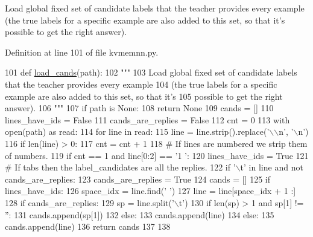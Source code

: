 \begin{DoxyVerb}Load global fixed set of candidate labels that the teacher provides every example
(the true labels for a specific example are also added to this set, so that it's
possible to get the right answer).
\end{DoxyVerb}
 

Definition at line 101 of file kvmemnn.\+py.


\begin{DoxyCode}
101 \textcolor{keyword}{def }\hyperlink{namespaceprojects_1_1personachat_1_1kvmemnn_1_1kvmemnn_a7f44d8ff34857c26b87223a668c43724}{load\_cands}(path):
102     \textcolor{stringliteral}{"""}
103 \textcolor{stringliteral}{    Load global fixed set of candidate labels that the teacher provides every example}
104 \textcolor{stringliteral}{    (the true labels for a specific example are also added to this set, so that it's}
105 \textcolor{stringliteral}{    possible to get the right answer).}
106 \textcolor{stringliteral}{    """}
107     \textcolor{keywordflow}{if} path \textcolor{keywordflow}{is} \textcolor{keywordtype}{None}:
108         \textcolor{keywordflow}{return} \textcolor{keywordtype}{None}
109     cands = []
110     lines\_have\_ids = \textcolor{keyword}{False}
111     cands\_are\_replies = \textcolor{keyword}{False}
112     cnt = 0
113     with open(path) \textcolor{keyword}{as} read:
114         \textcolor{keywordflow}{for} line \textcolor{keywordflow}{in} read:
115             line = line.strip().replace(\textcolor{stringliteral}{'\(\backslash\)\(\backslash\)n'}, \textcolor{stringliteral}{'\(\backslash\)n'})
116             \textcolor{keywordflow}{if} len(line) > 0:
117                 cnt = cnt + 1
118                 \textcolor{comment}{# If lines are numbered we strip them of numbers.}
119                 \textcolor{keywordflow}{if} cnt == 1 \textcolor{keywordflow}{and} line[0:2] == \textcolor{stringliteral}{'1 '}:
120                     lines\_have\_ids = \textcolor{keyword}{True}
121                 \textcolor{comment}{# If tabs then the label\_candidates are all the replies.}
122                 \textcolor{keywordflow}{if} \textcolor{stringliteral}{'\(\backslash\)t'} \textcolor{keywordflow}{in} line \textcolor{keywordflow}{and} \textcolor{keywordflow}{not} cands\_are\_replies:
123                     cands\_are\_replies = \textcolor{keyword}{True}
124                     cands = []
125                 \textcolor{keywordflow}{if} lines\_have\_ids:
126                     space\_idx = line.find(\textcolor{stringliteral}{' '})
127                     line = line[space\_idx + 1 :]
128                     \textcolor{keywordflow}{if} cands\_are\_replies:
129                         sp = line.split(\textcolor{stringliteral}{'\(\backslash\)t'})
130                         \textcolor{keywordflow}{if} len(sp) > 1 \textcolor{keywordflow}{and} sp[1] != \textcolor{stringliteral}{''}:
131                             cands.append(sp[1])
132                     \textcolor{keywordflow}{else}:
133                         cands.append(line)
134                 \textcolor{keywordflow}{else}:
135                     cands.append(line)
136     \textcolor{keywordflow}{return} cands
137 
138 
\end{DoxyCode}
